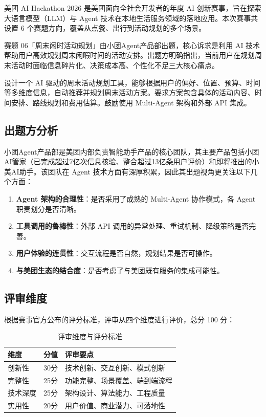 \documentclass[12pt,a4paper]{ctexart}
\begin{document}
美团 AI Hackathon 2026 是美团面向全社会开发者的年度 AI 创新赛事，旨在探索大语言模型（LLM）与 Agent 技术在本地生活服务领域的落地应用。本次赛事共设置 6 个赛题方向，覆盖从点餐、出行到活动规划的多个场景。

赛题 06「周末闲时活动规划」由小团Agent产品部出题，核心诉求是利用 AI 技术帮助用户高效规划周末闲暇时间的活动安排。出题方明确指出，当前用户在规划周末活动时面临信息碎片化、决策成本高、个性化不足三大核心痛点。

\begin{infobox}[赛题06原文要求]
设计一个 AI 驱动的周末活动规划工具，能够根据用户的偏好、位置、预算、时间等多维度信息，自动推荐并规划周末活动方案。要求方案包含具体的活动内容、时间安排、路线规划和费用估算。鼓励使用 Multi-Agent 架构和外部 API 集成。
\end{infobox}

\subsection{出题方分析}

小团Agent产品部是美团内部负责智能助手产品的核心团队，其主要产品包括小团AI管家（已完成超过7亿次信息核验、整合超过13亿条用户评价）和即将推出的小美AI助手。该团队在 Agent 技术方面有深厚积累，因此其出题视角更关注以下几个方面：

\begin{enumerate}[leftmargin=2em]
  \item \textbf{Agent 架构的合理性}：是否采用了成熟的 Multi-Agent 协作模式，各 Agent 职责划分是否清晰。
  \item \textbf{工具调用的鲁棒性}：外部 API 调用的异常处理、重试机制、降级策略是否完善。
  \item \textbf{用户体验的连贯性}：交互流程是否自然，规划结果是否可操作。
  \item \textbf{与美团生态的结合度}：是否考虑了与美团既有服务的集成可能性。
\end{enumerate}

\subsection{评审维度}

根据赛事官方公布的评分标准，评审从四个维度进行评价，总分 100 分：

\begin{table}[H]
\centering
\caption{评审维度与评分标准}
\label{tab:scoring}
\renewcommand{\arraystretch}{1.4}
\begin{tabular}{p{3cm} p{1.5cm} p{8cm}}
\toprule
\textbf{维度} & \textbf{分值} & \textbf{评审要点} \\
\midrule
创新性 & 30分 & 技术创新、交互创新、模式创新 \\
完整性 & 25分 & 功能完整、场景覆盖、端到端流程 \\
技术深度 & 25分 & 架构设计、算法能力、工程质量 \\
实用性 & 20分 & 用户价值、商业潜力、可落地性 \\
\bottomrule
\end{tabular}
\end{table}
\end{document}
